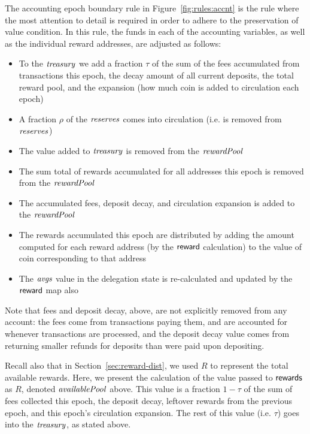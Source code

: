 The accounting epoch boundary rule in Figure~\ref{fig:rules:accnt} is the rule
where the most attention to detail is required in order to adhere to the
preservation of value condition. In this rule, the funds in each of the
accounting variables, as well as the individual reward addresses, are adjusted
as follows:

\begin{itemize}
\item To the $\mathit{treasury}$ we add a fraction $\tau$ of the sum of
the fees accumulated from transactions this epoch, the decay amount
of all current deposits, the total reward pool, and the expansion (how much
coin is added to circulation each epoch)
\item A fraction $\rho$ of the $\mathit{reserves}$ comes into circulation (i.e.
is removed from $\mathit{reserves}$)
\item The value added to $\mathit{treasury}$ is removed from the $\mathit{rewardPool}$
\item The sum total of rewards accumulated for all addresses this epoch
is removed from the $\mathit{rewardPool}$
\item The accumulated fees, deposit decay, and circulation expansion is
added to the $\mathit{rewardPool}$
\item The rewards accumulated this epoch are distributed by
adding the amount computed for each reward address (by the $\mathsf{reward}$ calculation)
to the value of coin corresponding to that address
\item The $\mathit{avgs}$ value in the delegation state is re-calculated and
updated by the $\mathsf{reward}$ map also
\end{itemize}

Note that fees and deposit decay, above, are not explicitly removed from any account:
the fees come from transactions paying them, and are accounted for whenever
transactions are processed, and the deposit decay value comes from returning
smaller refunds for deposits than were paid upon depositing.

Recall also that in Section~\ref{sec:reward-dist}, we used $R$ to represent
the total available rewards. Here, we present the calculation of the value
passed to $\mathsf{rewards}$ as $R$, denoted $\mathit{availablePool}$ above.
This value is a fraction $1-\tau$ of the sum of fees collected this epoch, the
deposit decay, leftover rewards from
the previous epoch, and this epoch's circulation expansion. The rest of this
value (i.e. $\tau$) goes into the $\mathit{treasury}$, as stated above.


